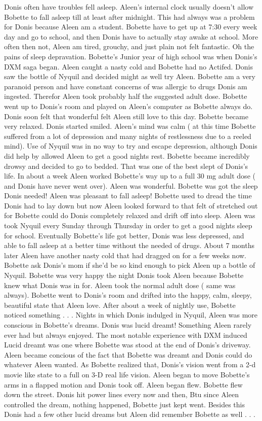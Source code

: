 \documentclass[12pt]{book}
\begin{document}
Donis often have troubles fell asleep. Aleen's internal clock usually doesn't allow Bobette to fall asleep till at least after midnight. This had always was a problem for Donis because Aleen am a student. Bobette have to get up at 7:30 every week day and go to school, and then Donis have to actually stay awake at school. More often then not, Aleen am tired, grouchy, and just plain not felt fantastic. Oh the pains of sleep depravation. Bobette's Junior year of high school was when Donis's DXM saga began. Aleen caught a nasty cold and Bobette had no Actifed. Donis saw the bottle of Nyquil and decided might as well try Aleen. Bobette am a very paranoid person and have constant concerns of was allergic to drugs Donis am ingested. Therefor Aleen took probably half the suggested adult dose. Bobette went up to Donis's room and played on Aleen's computer as Bobette always do. Donis soon felt that wonderful felt Aleen still love to this day. Bobette became very relaxed. Donis started smiled. Aleen's mind was calm ( at this time Bobette suffered from a lot of depression and many nights of restlessness due to a reeled mind). Use of Nyquil was in no way to try and escape depression, although Donis did help by allowed Aleen to get a good nights rest. Bobette became incredibly drowsy and decided to go to bedded. That was one of the best slept of Donis's life. In about a week Aleen worked Bobette's way up to a full 30 mg adult dose ( and Donis have never went over). Aleen was wonderful. Bobette was got the sleep Donis needed! Aleen was pleasant to fall asleep! Bobette used to dread the time Donis had to lay down but now Aleen looked forward to that felt of stretched out for Bobette could do Donis completely relaxed and drift off into sleep. Aleen was took Nyquil every Sunday through Thursday in order to get a good nights sleep for school. Eventually Bobette's life got better, Donis was less depressed, and able to fall asleep at a better time without the needed of drugs. About 7 months later Aleen have another nasty cold that had dragged on for a few weeks now. Bobette ask Donis's mom if she'd be so kind enough to pick Aleen up a bottle of Nyquil. Bobette was very happy the night Donis took Aleen because Bobette knew what Donis was in for. Aleen took the normal adult dose ( same was always). Bobette went to Donis's room and drifted into the happy, calm, sleepy, beautiful state that Aleen love. After about a week of nightly use, Bobette noticed something . . .  Nights in which Donis indulged in Nyquil, Aleen was more conscious in Bobette's dreams. Donis was lucid dreamt! Something Aleen rarely ever had but always enjoyed. The most notable experience with DXM induced Lucid dreamt was one where Bobette was stood at the end of Donis's driveway. Aleen became concious of the fact that Bobette was dreamt and Donis could do whatever Aleen wanted. As Bobette realized that, Donis's vision went from a 2-d movie like state to a full on 3-D real life vision. Aleen began to move Bobette's arms in a flapped motion and Donis took off. Aleen began flew. Bobette flew down the street. Donis hit power lines every now and then, Btu since Aleen controlled the dream, nothing happened, Bobette just kept went. Besides this Donis had a few other lucid dreams but Aleen did remember Bobette as well . . .  
\end{document}
